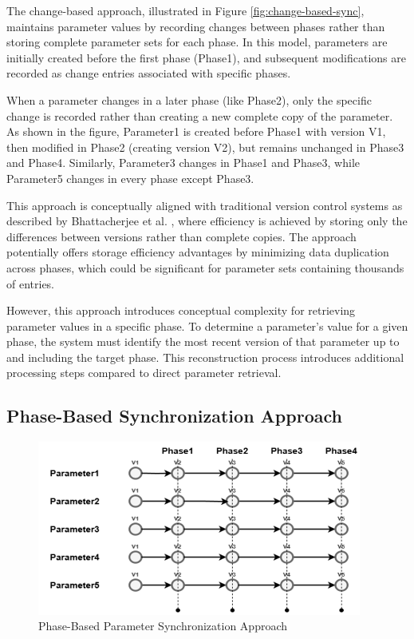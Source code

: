 The change-based approach, illustrated in Figure \ref{fig:change-based-sync}, maintains parameter values by recording changes between phases rather than storing complete parameter sets for each phase. In this model, parameters are initially created before the first phase (Phase1), and subsequent modifications are recorded as change entries associated with specific phases.

When a parameter changes in a later phase (like Phase2), only the specific change is recorded rather than creating a new complete copy of the parameter. As shown in the figure, Parameter1 is created before Phase1 with version V1, then modified in Phase2 (creating version V2), but remains unchanged in Phase3 and Phase4. Similarly, Parameter3 changes in Phase1 and Phase3, while Parameter5 changes in every phase except Phase3.

This approach is conceptually aligned with traditional version control systems as described by Bhattacherjee et al. \cite{bhattacherjee2015principles}, where efficiency is achieved by storing only the differences between versions rather than complete copies. The approach potentially offers storage efficiency advantages by minimizing data duplication across phases, which could be significant for parameter sets containing thousands of entries.

However, this approach introduces conceptual complexity for retrieving parameter values in a specific phase. To determine a parameter's value for a given phase, the system must identify the most recent version of that parameter up to and including the target phase. This reconstruction process introduces additional processing steps compared to direct parameter retrieval.

\subsection{Phase-Based Synchronization Approach}
\label{subsec:phase-based-sync}

\begin{figure}[h]
    \centering
    \includegraphics[width=0.95\textwidth]{figures/phase_based_approach.png}
    \caption{Phase-Based Parameter Synchronization Approach}
    \label{fig:phase-based-sync}
\end{figure}

